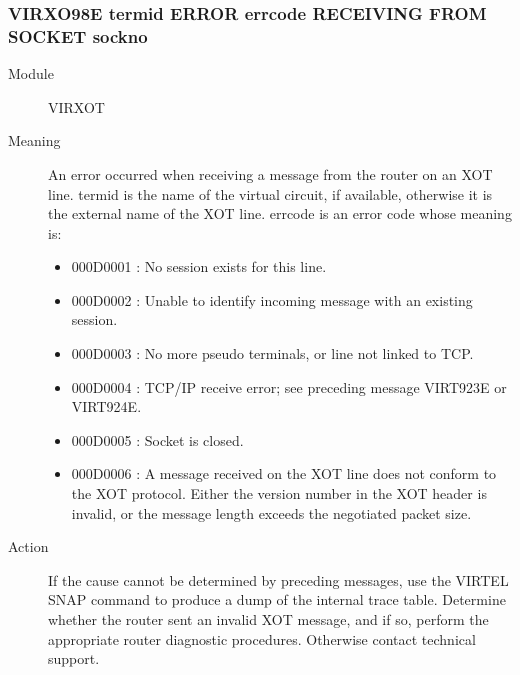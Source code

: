 \documentclass[letterpaper,10pt,english]{sphinxmanual}
\begin{document}
\subsubsection{VIRXO98E termid ERROR errcode RECEIVING FROM SOCKET sockno}
\label{\detokenize{messages:virxo98e-termid-error-errcode-receiving-from-socket-sockno}}\begin{description}
\item[{Module}] \leavevmode
VIRXOT

\item[{Meaning}] \leavevmode
An error occurred when receiving a message from the router on an XOT line. termid is the name of the virtual circuit, if available, otherwise it is the external name of the XOT line. errcode is an error code whose meaning is:
\begin{itemize}
\item {} 
000D0001 : No session exists for this line.

\item {} 
000D0002 : Unable to identify incoming message with an existing session.

\item {} 
000D0003 : No more pseudo terminals, or line not linked to TCP.

\item {} 
000D0004 : TCP/IP receive error; see preceding message VIRT923E or VIRT924E.

\item {} 
000D0005 : Socket is closed.

\item {} 
000D0006 : A message received on the XOT line does not conform to the XOT protocol. Either the version number in the XOT header is invalid, or the message length exceeds the negotiated packet size.

\end{itemize}

\item[{Action}] \leavevmode
If the cause cannot be determined by preceding messages, use the VIRTEL SNAP command to produce a dump of the internal trace table. Determine whether the router sent an invalid XOT message, and if so, perform the appropriate router diagnostic procedures. Otherwise contact technical support.

\end{description}
\end{document}
